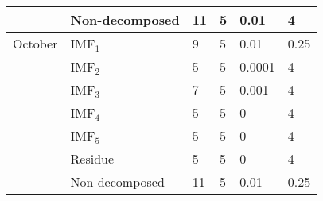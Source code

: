 \begin{scriptsize}
\begin{center}
\begin{longtable}[htb!]{llllll}
           & Non-decomposed             & 11                               & 5                                 & 0.01                                      & 4 \\ \hline
October    & IMF$_1$                    & 9                                & 5                                 & 0.01                                      & 0.25 \\
           & IMF$_2$                    & 5                                & 5                                 & 0.0001                                    & 4 \\
           & IMF$_3$                    & 7                                & 5                                 & 0.001                                     & 4 \\
           & IMF$_4$                    & 5                                & 5                                 & 0                                         & 4 \\
           & IMF$_5$                    & 5                                & 5                                 & 0                                         & 4 \\
           & Residue                    & 5                                & 5                                 & 0                                         & 4 \\
           & Non-decomposed             & 11                               & 5                                 & 0.01                                      & 0.25 \\ \hline
\end{longtable}
\end{center}
\end{scriptsize}

